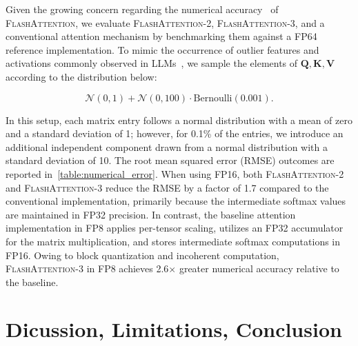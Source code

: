 Given the growing concern regarding the numerical accuracy~\citep{golden2024flash} of
\textsc{FlashAttention}, we evaluate \textsc{FlashAttention-2}, \textsc{FlashAttention-3}, and a conventional attention mechanism by benchmarking them against a FP64 reference implementation. To mimic the occurrence of outlier features and activations commonly observed in LLMs~\citep{dettmers2208llm,
  sun2024massive}, we sample the elements of $\mathbf{Q}, \mathbf{K}, \mathbf{V}$ according to the distribution below:

\begin{equation*}
  \mathcal{N}(0, 1) + \mathcal{N}(0, 100) \cdot \mathrm{Bernoulli}(0.001).
\end{equation*}

In this setup, each matrix entry follows a normal distribution with a mean of zero and a standard deviation of 1; however, for 0.1\% of the entries, we introduce an additional independent component drawn from a normal distribution with a standard deviation of 10. The root mean squared error (RMSE) outcomes are reported in~\cref{table:numerical_error}. When using FP16, both \textsc{FlashAttention-2} and \textsc{FlashAttention-3} reduce the RMSE by a factor of 1.7 compared to the conventional implementation, primarily because the intermediate softmax values are maintained in FP32 precision. In contrast, the baseline attention implementation in FP8 applies per-tensor scaling, utilizes an FP32 accumulator for the matrix multiplication, and stores intermediate softmax computations in FP16. Owing to block quantization and incoherent computation, \textsc{FlashAttention-3} in FP8 achieves 2.6$\times$ greater numerical accuracy relative to the baseline.

\section{Dicussion, Limitations, Conclusion}
\label{sec:discussion}

